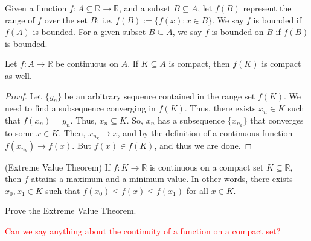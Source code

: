 \documentclass{ximera}
\begin{document}
\begin{definition}
    Given a function $f : A\subseteq \mathbb{R} \to \mathbb{R}$, and a subset $B \subseteq A$, let $f(B)$ represent the range of $f$ over the set $B$; i.e. $f(B):=\{f(x):x\in B\}$.  We say $f$ is bounded if $f(A)$ is bounded.  For a given subset $B\subseteq A$, we say $f$ is bounded on $B$ if $f(B)$ is bounded.  
\end{definition}

\begin{theorem}
    Let $f:A \to \mathbb{R}$ be continuous on $A$.  If $K\subseteq A$ is compact, then $f(K)$ is compact as well.  
\end{theorem}
\begin{proof}
    Let $\{y_n\}$ be an arbitrary sequence contained in the range set $f(K)$.  We need to find a subsequence converging in $f(K)$.  Thus, there exists $x_n \in K$ such that $f(x_n) = y_n$.  Thus, $x_n \subseteq K$.  So, $x_n$ has a subsequence $\{x_{n_k}\}$ that converges to some $x \in K$.  Then, $x_{n_k} \to x$, and by the definition of a continuous function $f(x_{n_k}) \to f(x)$.  But $f(x) \in f(K)$, and thus we are done.
\end{proof}

\begin{theorem}{(Extreme Value Theorem)}
    If $f : K \to \mathbb{R}$ is continuous on a compact set $K\subseteq \mathbb{R}$, then $f$ attains a maximum and a minimum value.  In other words, there exists $x_0, x_1 \in K$ such that $f(x_0) \leq f(x) \leq f(x_1)$ for all $x \in K$.
 \end{theorem}

 \begin{exercise}
    Prove the Extreme Value Theorem.
 \end{exercise}

\textcolor{red}{Can we say anything about the continuity of a function on a compact set?}
\end{document}

